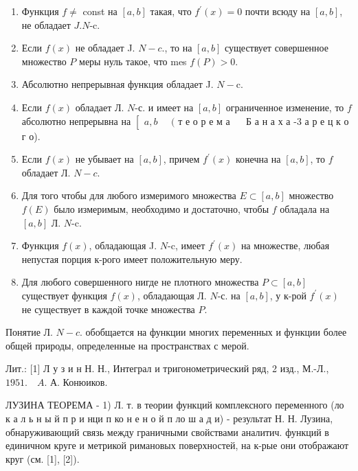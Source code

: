 \documentclass[10pt]{article}
\begin{document}
\begin{enumerate}

  \item Функция $f \neq$ const на $[a, b]$ такая, что $f^{\prime}(x)=0$ почти всюду на $[a, b]$, не обладает $J . N$-c.



  \item Если $f(x)$ не обладает J. $N-c .$, то на $[a, b]$ существует совершенное множество $P$ меры нуль такое, что mes $f(P)>0$.



  \item Абсолютно непрерывная функция обладает J. $N-\mathrm{c}$.



  \item Если $f(x)$ обладает Л. $N$-с. и имеет на $[a, b]$ ограниченное изменение, то $f$ абсолютно непрерывна на $\left[\begin{array}{ll}a, b\end{array} \quad(\right.$ т е о р е м а $\quad$ Б а н а х а -3 а р е ц к о г о).



  \item Если $f(x)$ не убывает на $[a, b]$, причем $f^{\prime}(x)$ конечна на $[a, b]$, то $f$ обладает Л. $N-c$.



  \item Для того чтобы для любого измеримого множества $E \subset[a, b]$ множество $f(E)$ было измеримым, необходимо и достаточно, чтобы $f$ обладала на $[a, b]$ Л. $N$-c.



  \item Функция $f(x)$, обладающая J. $N$-c, имеет $f^{\prime}(x)$ на множестве, любая непустая порция к-рого имеет положительную меру.



  \item Для любого совершенного нигде не плотного множества $P \subset[a, b]$ существует функция $f(x)$, обладающая Л. $N$-с. на $[a, b]$, у к-рой $f^{\prime}(x)$ не существует в каждой точке множества $P$.



\end{enumerate}



Понятие Л. $N-c$. обобщается на функции многих переменных и функции более общей природы, определенные на пространствах с мерой.



Лит.: [1] Л у з и н Н. Н., Интеграл и тригонометрический ряд, 2 изд., М.-Л., $1951 . \quad A$. А. Конюиков.



ЛУЗИНА ТЕОРЕМА - 1) Л. т. в теории функций комплексного переменного (ло к а л ь н ы й п р и нци п ко н е н о й п ло ш а д и) - результат Н. Н. Лузина, обнаруживающий связь между граничными свойствами аналитич. функций в единичном круге и метрикой римановых поверхностей, на к-рые они отображают круг (см. [1], [2]).
\end{document}
